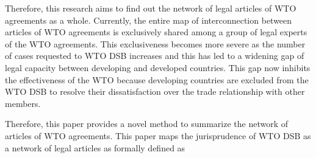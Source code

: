 Therefore, this research aims to find out the network of legal articles of WTO agreements as a whole.
Currently, the entire map of interconnection between articles of WTO agreements is exclusively shared among a group of legal experts of the WTO agreements.
This exclusiveness becomes more severe as the number of cases requested to WTO DSB increases and this has led to a widening gap of legal capacity between developing and developed countries.
This gap now inhibits the effectiveness of the WTO because developing countries are excluded from the WTO DSB to resolve their dissatisfaction over the trade relationship with other members.

Therefore, this paper provides a novel method to summarize the network of articles of WTO agreements. 
This paper maps
the jurisprudence of WTO DSB
as a network of legal articles
as formally defined as

